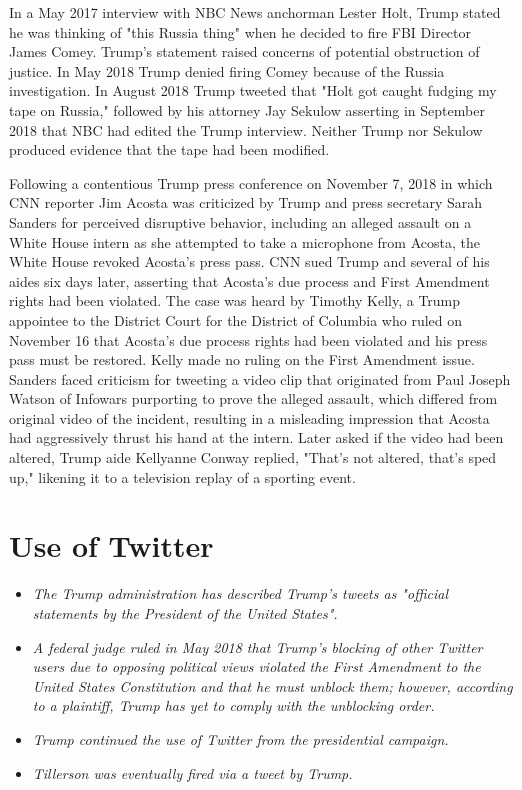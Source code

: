 In a May 2017 interview with NBC News anchorman Lester Holt, Trump
stated he was thinking of "this Russia thing" when he decided to fire
FBI Director James Comey. Trump's statement raised concerns of potential
obstruction of justice. In May 2018 Trump denied firing Comey because of
the Russia investigation. In August 2018 Trump tweeted that "Holt got
caught fudging my tape on Russia," followed by his attorney Jay Sekulow
asserting in September 2018 that NBC had edited the Trump interview.
Neither Trump nor Sekulow produced evidence that the tape had been
modified.

Following a contentious Trump press conference on November 7, 2018 in
which CNN reporter Jim Acosta was criticized by Trump and press
secretary Sarah Sanders for perceived disruptive behavior, including an
alleged assault on a White House intern as she attempted to take a
microphone from Acosta, the White House revoked Acosta's press pass. CNN
sued Trump and several of his aides six days later, asserting that
Acosta's due process and First Amendment rights had been violated. The
case was heard by Timothy Kelly, a Trump appointee to the District Court
for the District of Columbia who ruled on November 16 that Acosta's due
process rights had been violated and his press pass must be restored.
Kelly made no ruling on the First Amendment issue. Sanders faced
criticism for tweeting a video clip that originated from Paul Joseph
Watson of Infowars purporting to prove the alleged assault, which
differed from original video of the incident, resulting in a misleading
impression that Acosta had aggressively thrust his hand at the intern.
Later asked if the video had been altered, Trump aide Kellyanne Conway
replied, "That's not altered, that's sped up," likening it to a
television replay of a sporting event.

\section{Use of Twitter}\label{use-of-twitter}

\begin{itemize}
\item
  \emph{The Trump administration has described Trump's tweets as
  "official statements by the President of the United States".}
\item
  \emph{A federal judge ruled in May 2018 that Trump's blocking of other
  Twitter users due to opposing political views violated the First
  Amendment to the United States Constitution and that he must unblock
  them; however, according to a plaintiff, Trump has yet to comply with
  the unblocking order.}
\item
  \emph{Trump continued the use of Twitter from the presidential
  campaign.}
\item
  \emph{Tillerson was eventually fired via a tweet by Trump.}
\end{itemize}

